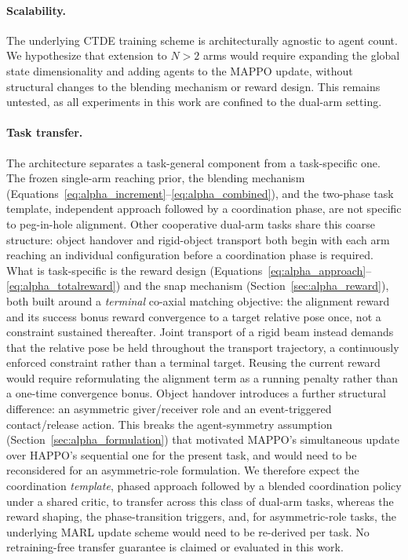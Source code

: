 \paragraph{Scalability.} The underlying CTDE training scheme is architecturally agnostic to agent
count. We hypothesize that extension to $N > 2$ arms would require expanding the global state
dimensionality and adding agents to the MAPPO update, without structural changes to the blending
mechanism or reward design. This remains untested, as all experiments in this work are confined to the
dual-arm setting.

\paragraph{Task transfer.} The architecture separates a task-general component from a task-specific
one. The frozen single-arm reaching prior, the blending mechanism
(Equations~\eqref{eq:alpha_increment}--\eqref{eq:alpha_combined}), and the two-phase task template,
independent approach followed by a coordination phase, are not specific to peg-in-hole alignment.
Other cooperative dual-arm tasks share this coarse structure: object handover and rigid-object
transport both begin with each arm reaching an individual configuration before a coordination phase is
required. What is task-specific is the reward design
(Equations~\eqref{eq:alpha_approach}--\eqref{eq:alpha_totalreward}) and the snap mechanism
(Section~\ref{sec:alpha_reward}), both built around a \emph{terminal} co-axial matching objective:
the alignment reward and its success bonus reward convergence to a target relative pose once, not a
constraint sustained thereafter. Joint transport of a rigid beam instead demands that the relative
pose be held throughout the transport trajectory, a continuously enforced constraint rather than a
terminal target. Reusing the current reward would require reformulating the alignment term as a
running penalty rather than a one-time convergence bonus. Object handover introduces a further
structural difference: an asymmetric giver/receiver role and an event-triggered contact/release
action. This breaks the agent-symmetry assumption (Section~\ref{sec:alpha_formulation}) that motivated
MAPPO's simultaneous update over HAPPO's sequential one for the present task, and would need to be
reconsidered for an asymmetric-role formulation. We therefore expect the coordination \emph{template},
phased approach followed by a blended coordination policy under a shared critic, to transfer across
this class of dual-arm tasks, whereas the reward shaping, the phase-transition triggers, and, for
asymmetric-role tasks, the underlying MARL update scheme would need to be re-derived per task. No
retraining-free transfer guarantee is claimed or evaluated in this work.

